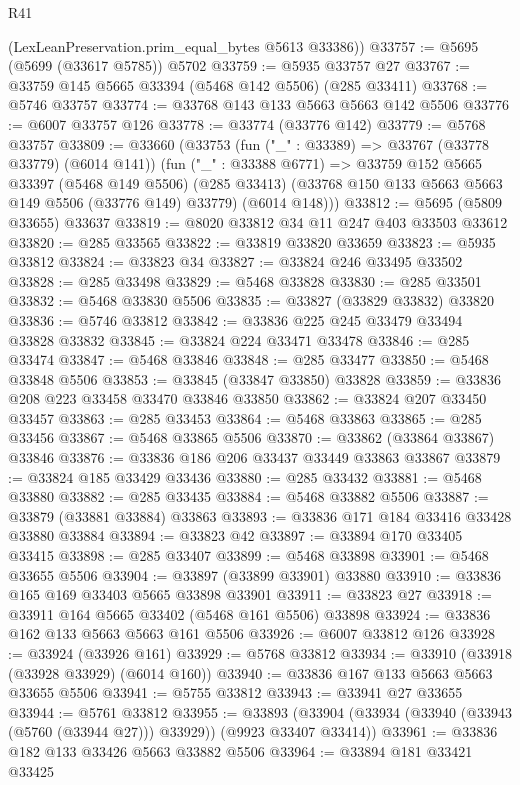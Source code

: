 \begin{lexlean}{R41}
\begin{coremodule}
      (LexLeanPreservation.prim_equal_bytes @5613 @33386))
@33757 := @5695 (@5699 (@33617 @5785)) @5702
@33759 := @5935 @33757 @27
@33767 := @33759 @145 @5665 @33394 (@5468 @142 @5506) (@285 @33411)
@33768 := @5746 @33757
@33774 := @33768 @143 @133 @5663 @5663 @142 @5506
@33776 := @6007 @33757 @126
@33778 := @33774 (@33776 @142)
@33779 := @5768 @33757
@33809 := @33660
    (@33753
      (fun ("_" : @33389) => @33767 (@33778 @33779) (@6014 @141))
      (fun ("_" : @33388 @6771) =>
      @33759
        @152
        @5665
        @33397
        (@5468 @149 @5506)
        (@285 @33413)
        (@33768 @150 @133 @5663 @5663 @149 @5506 (@33776 @149) @33779)
        (@6014 @148)))
@33812 := @5695 (@5809 @33655) @33637
@33819 := @8020 @33812 @34 @11 @247 @403 @33503 @33612
@33820 := @285 @33565
@33822 := @33819 @33820 @33659
@33823 := @5935 @33812
@33824 := @33823 @34
@33827 := @33824 @246 @33495 @33502
@33828 := @285 @33498
@33829 := @5468 @33828
@33830 := @285 @33501
@33832 := @5468 @33830 @5506
@33835 := @33827 (@33829 @33832) @33820
@33836 := @5746 @33812
@33842 := @33836 @225 @245 @33479 @33494 @33828 @33832
@33845 := @33824 @224 @33471 @33478
@33846 := @285 @33474
@33847 := @5468 @33846
@33848 := @285 @33477
@33850 := @5468 @33848 @5506
@33853 := @33845 (@33847 @33850) @33828
@33859 := @33836 @208 @223 @33458 @33470 @33846 @33850
@33862 := @33824 @207 @33450 @33457
@33863 := @285 @33453
@33864 := @5468 @33863
@33865 := @285 @33456
@33867 := @5468 @33865 @5506
@33870 := @33862 (@33864 @33867) @33846
@33876 := @33836 @186 @206 @33437 @33449 @33863 @33867
@33879 := @33824 @185 @33429 @33436
@33880 := @285 @33432
@33881 := @5468 @33880
@33882 := @285 @33435
@33884 := @5468 @33882 @5506
@33887 := @33879 (@33881 @33884) @33863
@33893 := @33836 @171 @184 @33416 @33428 @33880 @33884
@33894 := @33823 @42
@33897 := @33894 @170 @33405 @33415
@33898 := @285 @33407
@33899 := @5468 @33898
@33901 := @5468 @33655 @5506
@33904 := @33897 (@33899 @33901) @33880
@33910 := @33836 @165 @169 @33403 @5665 @33898 @33901
@33911 := @33823 @27
@33918 := @33911 @164 @5665 @33402 (@5468 @161 @5506) @33898
@33924 := @33836 @162 @133 @5663 @5663 @161 @5506
@33926 := @6007 @33812 @126
@33928 := @33924 (@33926 @161)
@33929 := @5768 @33812
@33934 := @33910 (@33918 (@33928 @33929) (@6014 @160))
@33940 := @33836 @167 @133 @5663 @5663 @33655 @5506
@33941 := @5755 @33812
@33943 := @33941 @27 @33655
@33944 := @5761 @33812
@33955 := @33893
    (@33904 (@33934 (@33940 (@33943 (@5760 (@33944 @27))) @33929)) (@9923 @33407 @33414))
@33961 := @33836 @182 @133 @33426 @5663 @33882 @5506
@33964 := @33894 @181 @33421 @33425

\end{coremodule}
\end{lexlean}

